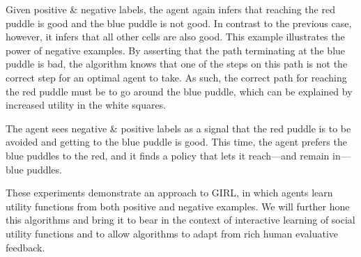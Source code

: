 Given positive \& negative labels, the agent again infers that
reaching the red puddle is good and the blue puddle is not
good. In contrast to the previous case, however, it infers that all
other cells are also good. This example illustrates the power of
negative examples. By asserting that the path terminating at the blue
puddle is bad, the algorithm knows that one of the steps on this path
is not the correct step for an optimal agent to take. As such, the
correct path for reaching the red puddle must be to go around the blue
puddle, which can be explained by increased utility in the white
squares.

The agent sees negative \& positive labels as a signal that the red
puddle is to be avoided and getting to the blue puddle is good.  This
time, the agent prefers the blue puddles to the red, and it finds a
policy that lets it reach---and remain in---blue puddles.


These experiments demonstrate an approach to GIRL, in which agents
learn utility functions from both positive and negative examples.
We will further hone this algorithms and bring it to bear in the
context of interactive learning of social utility functions and to
allow algorithms to adapt from rich human evaluative feedback.


